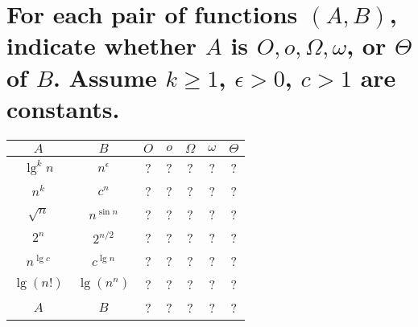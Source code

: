 \section[Problem 5]{For each pair of functions $(A, B)$, indicate whether $A$ is $O, o, \Omega, \omega$, or $\Theta$ of $B$. Assume $k \geq 1$, $\epsilon > 0$, $c > 1$ are constants.}
\begin{center}
	\begin{tabular}{cc|c|c|c|c|c}
		$A$ & $B$ & $O$ & $o$ & $\Omega$ & $\omega$ & $\Theta$ \\ \hline
		$\lg^k n$ & $n^{\epsilon}$ & ? & ? & ? & ? & ? \\ \hline
		$n^k$ & $c^n$ & ? & ? & ? & ? & ? \\ \hline
		$\sqrt{n}$ & $n^{\sin n}$ & ? & ? & ? & ? & ? \\ \hline
		$2^n$ & $2^{n/2}$ & ? & ? & ? & ? & ? \\ \hline
		$n^{\lg c}$ & $c^{\lg n}$ & ? & ? & ? & ? & ? \\ \hline
		$\lg(n!)$ & $\lg(n^n)$ & ? & ? & ? & ? & ? \\ \hline
		$A$ & $B$ & ? & ? & ? & ? & ?
	\end{tabular}
\end{center}


